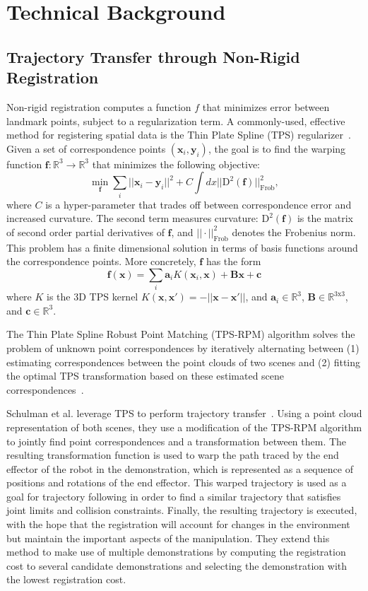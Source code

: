 \section{Technical Background}

\subsection{Trajectory Transfer through Non-Rigid Registration}
Non-rigid registration computes a function $f$ that minimizes error between landmark points, subject to a regularization term.
A commonly-used, effective method for registering spatial data is the Thin Plate Spline (TPS) regularizer~\cite{Carr_SIGGRAPH2001, Wahba_TPS1990}.
Given a set of correspondence points $(\mathbf{x}_i, \mathbf{y}_i)$, the goal is to find the warping function $\mathbf{f} : \mathbb{R}^3 \rightarrow \mathbb{R}^3$ that minimizes the following objective:
$$\min_{\mathbf{f}} \sum_i ||\mathbf{x}_i - \mathbf{y}_i||^2 + C\int dx ||\text{D}^2(\mathbf{f})||^2_{\text{Frob}},$$
where $C$ is a hyper-parameter that trades off between correspondence error and increased curvature.
The second term measures curvature: $\text{D}^2(\mathbf{f})$ is the matrix of second order partial derivatives of $\mathbf{f}$, and $||\cdot||^2_{\text{Frob}}$
denotes the Frobenius norm.
This problem has a finite dimensional solution in terms of basis functions around the correspondence points.
More concretely, $\mathbf{f}$ has the form
$$\mathbf{f}(\mathbf{x}) = \sum_i \mathbf{a}_i K(\mathbf{x}_i, \mathbf{x}) + \mathbf{B}\mathbf{x} + \mathbf{c}$$
where $K$ is the 3D TPS kernel $K(\mathbf{x}, \mathbf{x}') = - ||\mathbf{x} - \mathbf{x}'||$, and $\mathbf{a}_i \in \mathbb{R}^3$, $\mathbf{B} \in \mathbb{R}^{3\text{x}3}$, and $\mathbf{c} \in \mathbb{R}^3$.

The Thin Plate Spline Robust Point Matching (TPS-RPM) algorithm solves the problem of unknown point correspondences
by iteratively alternating between (1) estimating correspondences between the point clouds of two scenes and (2) fitting the optimal TPS transformation based on these estimated scene correspondences~\cite{Chui_CVIU2003}.

Schulman et al. leverage TPS to perform trajectory transfer~\cite{Schulmanetal_ISRR2013}.
Using a point cloud representation of both scenes, they use a modification of the TPS-RPM algorithm to jointly find point correspondences and a transformation between them.
The resulting transformation function is used to warp the path traced by the end effector of the robot in the demonstration, which is
represented as a sequence of positions and rotations of the end effector.
This warped trajectory is used as a goal for trajectory following in order to find a similar trajectory that satisfies joint limits and collision constraints.
Finally, the resulting trajectory is executed, with the hope that the registration will account for changes in the environment but maintain the important aspects of the manipulation.
They extend this method to make use of multiple demonstrations by computing the registration cost to several candidate demonstrations and selecting the demonstration with the lowest registration cost.

